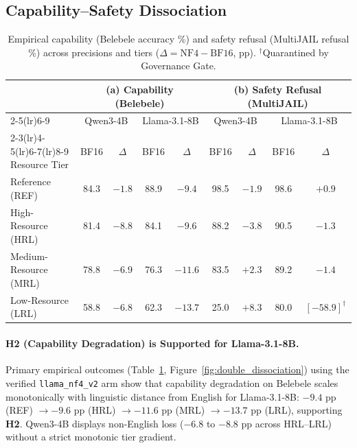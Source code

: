 \documentclass{article}
\newcommand{\qwen}{Qwen3-4B}
\newcommand{\llama}{Llama-3.1-8B}
\begin{document}
\subsection{Capability--Safety Dissociation}

\begin{table}[t]
\centering
\footnotesize
\setlength{\tabcolsep}{3.2pt}
\caption{Empirical capability (Belebele accuracy \%) and safety refusal (MultiJAIL refusal \%) across precisions and tiers ($\Delta = \text{NF4} - \text{BF16}$, pp). $^\dagger$Quarantined by Governance Gate.}
\label{tab:outcomes}
\vspace{3pt}
\begin{tabular}{lcccc|cccc}
\toprule
& \multicolumn{4}{c}{\textbf{(a) Capability (Belebele)}} & \multicolumn{4}{c}{\textbf{(b) Safety Refusal (MultiJAIL)}} \\
\cmidrule(lr){2-5}\cmidrule(lr){6-9}
& \multicolumn{2}{c}{\qwen{}} & \multicolumn{2}{c}{\llama{}} & \multicolumn{2}{c}{\qwen{}} & \multicolumn{2}{c}{\llama{}} \\
\cmidrule(lr){2-3}\cmidrule(lr){4-5}\cmidrule(lr){6-7}\cmidrule(lr){8-9}
Resource Tier & BF16 & $\Delta$ & BF16 & $\Delta$ & BF16 & $\Delta$ & BF16 & $\Delta$ \\
\midrule
Reference (REF)      & 84.3 & $-1.8$ & 88.9 & $-9.4$ & 98.5 & $-1.9$ & 98.6 & $+0.9$ \\
High-Resource (HRL)   & 81.4 & $-8.8$ & 84.1 & $-9.6$ & 88.2 & $-3.8$ & 90.5 & $-1.3$ \\
Medium-Resource (MRL) & 78.8 & $-6.9$ & 76.3 & $-11.6$ & 83.5 & $+2.3$ & 89.2 & $-1.4$ \\
Low-Resource (LRL)    & 58.8 & $-6.8$ & 62.3 & $\mathbf{-13.7}$ & 25.0 & $+8.3$ & 80.0 & $[-58.9]^\dagger$ \\
\bottomrule
\end{tabular}
\vspace{-6pt}
\end{table}

\paragraph{H2 (Capability Degradation) is Supported for \llama{}.}
Primary empirical outcomes (Table~\ref{tab:outcomes}, Figure~\ref{fig:double_dissociation}) using the verified \texttt{llama\_nf4\_v2} arm show that capability degradation on Belebele scales monotonically with linguistic distance from English for \llama{}: $-9.4$ pp (REF) $\to -9.6$ pp (HRL) $\to -11.6$ pp (MRL) $\to -13.7$ pp (LRL), supporting \textbf{H2}. \qwen{} displays non-English loss ($-6.8$ to $-8.8$ pp across HRL--LRL) without a strict monotonic tier gradient.
\end{document}
